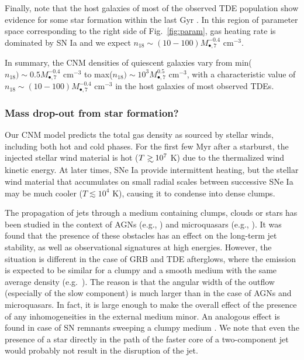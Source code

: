 \documentclass[usenatbib,fleqn]{mnras}
\newcommand\gsim{\mathrel{\rlap{\lower4pt\hbox{\hskip1pt$\sim$}}
    \raise1pt\hbox{$>$}}}
\newcommand{\Mbh}[1][]{M_{\bullet#1}}
\begin{document}
Finally, note that the host galaxies of most of the observed TDE
population show evidence for some star formation within the last Gyr
\citep{French+2016}.  In this region of parameter space corresponding
to the right side of Fig.~\ref{fig:param}, gas heating rate is
dominated by SN Ia and we expect $n_{18}\sim (10-100)
\Mbh[,7]^{-0.4}$ cm$^{-3}$.

In summary, the CNM densities of quiescent galaxies vary from
min($n_{18}) \sim 0.5 \Mbh[,7]^{-0.4}$ cm$^{-3}$
to max($n_{18})\sim 10^{3} \Mbh[,7]^{0.5}$ cm$^{-3}$, with a
characteristic value of $n_{18}\sim (10-100)
\Mbh[,7]^{-0.4}$ cm$^{-3}$ in the host galaxies of most observed TDEs.

\subsubsection{Mass drop-out from star formation?}

Our CNM model predicts the total gas density as sourced by
stellar winds, including both hot and cold phases.  For the first few
Myr after a starburst, the injected stellar wind material is hot
($T\gsim 10^{7}$ K) due to the thermalized wind kinetic energy.
At later times, SNe Ia provide intermittent heating, but the stellar wind
material that accumulates on small radial scales between successive SNe Ia
may be much cooler ($T \lesssim 10^{4}$ K), causing it to condense
into dense clumps.

The propagation of jets through a medium containing clumps, clouds or
stars has been studied in the context of AGNs (e.g.,
\citealt{WangWiita+2000, ChoiWiita+2007}) and microquasars (e.g.,
\citealt{Araudo+2009,Perucho+2012}). It was found that the presence of
these obstacles has an effect on the long-term jet stability, as well
as observational signatures at high energies. However, the situation
is different in the case of GRB and TDE afterglows, where the emission
is expected to be similar for a clumpy and a smooth medium with the
same average density
(e.g.~\citealt{Nakar&Granot2007,van-Eerten+2009,Mimica&Giannios2011}). The
reason is that the angular width of the outflow (especially of the
slow component) is much larger than in the case of AGNs and
microquasars. In fact, it is large enough to make the overall effect
of the presence of any inhomogeneities in the external medium
minor. An analogous effect is found in case of SN remnants sweeping a
clumpy medium \citep{Obergaulinger+2015}. We note that even the presence
of a star directly in the path of the faster core of a two-component
jet would probably not result in the disruption of the jet. 
\end{document}
